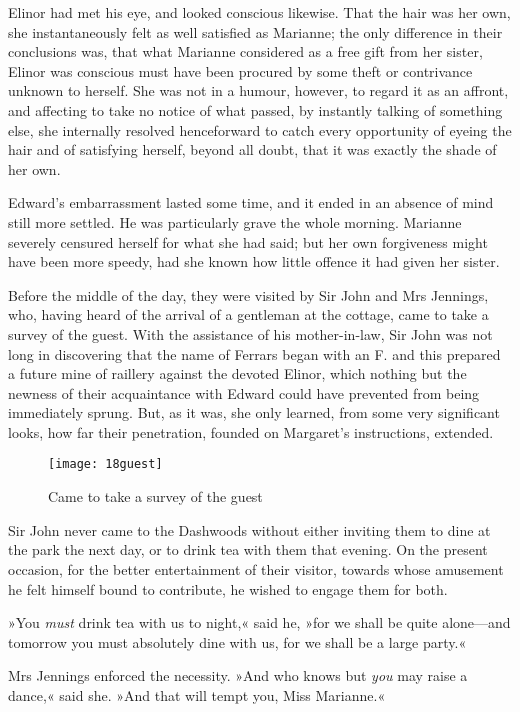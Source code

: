 Elinor had met his eye, and looked conscious likewise. That the hair was her own, she instantaneously felt as well satisfied as Marianne; the only difference in their conclusions was, that what Marianne considered as a free gift from her sister, Elinor was conscious must have been procured by some theft or contrivance unknown to herself. She was not in a humour, however, to regard it as an affront, and affecting to take no notice of what passed, by instantly talking of something else, she internally resolved henceforward to catch every opportunity of eyeing the hair and of satisfying herself, beyond all doubt, that it was exactly the shade of her own.

Edward’s embarrassment lasted some time, and it ended in an absence of mind still more settled. He was particularly grave the whole morning. Marianne severely censured herself for what she had said; but her own forgiveness might have been more speedy, had she known how little offence it had given her sister.

Before the middle of the day, they were visited by Sir John and Mrs Jennings, who, having heard of the arrival of a gentleman at the cottage, came to take a survey of the guest. With the assistance of his mother-in-law, Sir John was not long in discovering that the name of Ferrars began with an F. and this prepared a future mine of raillery against the devoted Elinor, which nothing but the newness of their acquaintance with Edward could have prevented from being immediately sprung. But, as it was, she only learned, from some very significant looks, how far their penetration, founded on Margaret’s instructions, extended.

\begin{figure}[tbh]
\centering
\texttt{[image: 18guest]}
\caption{Came to take a survey of the guest}
\end{figure}

Sir John never came to the Dashwoods without either inviting them to dine at the park the next day, or to drink tea with them that evening. On the present occasion, for the better entertainment of their visitor, towards whose amusement he felt himself bound to contribute, he wished to engage them for both.

»You \textit{must} drink tea with us to night,« said he, »for we shall be quite alone—and tomorrow you must absolutely dine with us, for we shall be a large party.«

Mrs Jennings enforced the necessity. »And who knows but \textit{you} may raise a dance,« said she. »And that will tempt you, Miss Marianne.«

